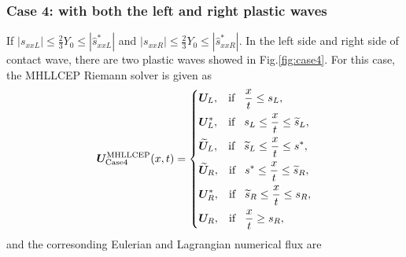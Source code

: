 \documentclass{article}
\numberwithin{equation}{section}
\numberwithin{table}{section}
\begin{document}
\subsubsection{Case 4: with both the left and right plastic waves}

If $|s_{xxL}| \le \frac{2}{3}Y_0 \le  |\hat{s}_{xxL}^*|$ and  $|s_{xxR}| \le \frac{2}{3}Y_0 \le  |\hat{s}_{xxR}^*|$. In the left side  and right side of contact wave, there are two plastic waves showed in Fig.\ref{fig:case4}. For this case, the MHLLCEP Riemann solver is given as
 \begin{equation}
   \bm{U}^{\text{MHLLCEP}}_{\text{Case4}}(x,t) = \left\{ \begin{aligned}
		& \bm{U}_L, \hspace{0.3cm} \text{if} \hspace{0.3cm} \frac{x}{t}\le s_L, \\
		& \bm{U}_L^*, \hspace{0.3cm} \text{if} \hspace{0.3cm} s_L\le \frac{x}{t} \le \widetilde{s}_L, \\
		& \widetilde{\bm{U}}_L, \hspace{0.3cm} \text{if} \hspace{0.3cm} \widetilde{s}_L\le \frac{x}{t} \le s^*, \\
		& \widetilde{\bm{U}}_R, \hspace{0.3cm} \text{if} \hspace{0.3cm} s^*\le \frac{x}{t} \le \widetilde{s}_R, \\
		& \bm{U}_R^*, \hspace{0.3cm} \text{if} \hspace{0.3cm} \widetilde{s}_R\le \frac{x}{t} \le s_R,\\
		& \bm{U}_R, \hspace{0.3cm} \text{if} \hspace{0.3cm} \frac{x}{t}\ge s_R, \\
	  \end{aligned}
	\right.
  \end{equation}
  and the corresonding Eulerian and Lagrangian numerical flux are
\end{document}
